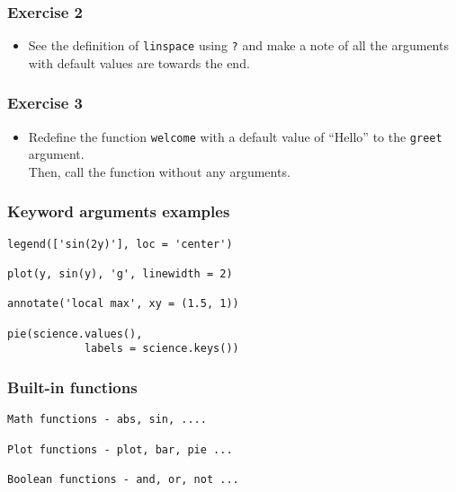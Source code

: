 \documentclass[17pt,compress]{beamer}
\begin{document}
\begin{frame}
\frametitle{Exercise 2}
\label{sec-7}

\begin{itemize}
\item See the definition of \texttt{linspace} using \texttt{?} and make a note of all the
  arguments with default values are towards the end.
\end{itemize}
\end{frame}
\begin{frame}
\frametitle{Exercise 3}
\label{sec-8}

\begin{itemize}
\item Redefine the function \texttt{welcome} with a default value of
  ``Hello'' to the \texttt{greet} argument.\\ 
  Then, call the function without any arguments.
\end{itemize}
\end{frame}
\begin{frame}[fragile]
\frametitle{Keyword arguments examples}
\label{sec-9}

\lstset{language=Python}
\begin{small}
\begin{lstlisting}
legend(['sin(2y)'], loc = 'center')

plot(y, sin(y), 'g', linewidth = 2)

annotate('local max', xy = (1.5, 1))

pie(science.values(),      
            labels = science.keys())
\end{lstlisting}
\end{small}
\end{frame}
\begin{frame}[fragile]
\frametitle{Built-in functions}
\label{sec-10}

\lstset{language=Python}
\begin{small}
\begin{lstlisting}
Math functions - abs, sin, ....
 
Plot functions - plot, bar, pie ...
 
Boolean functions - and, or, not ...
\end{lstlisting}
\end{small}
\end{frame}
\end{document}

